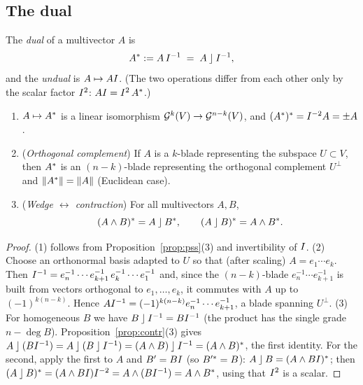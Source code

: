 \subsection{The dual}

\begin{definition}\label{def:dual}
The \emph{dual} of a multivector $A$ is
\[
 A^{\ast}:=A\,I^{-1}\;=\;A\mathbin{\rfloor}I^{-1},
\]
and the \emph{undual} is $A\mapsto AI$. (The two operations differ from each other only by the scalar factor $I^{2}$: $AI=I^2\,A^{\ast}$.)
\end{definition}

\begin{theorem}\label{thm:dual}
\begin{enumerate}
  \item $A\mapsto A^{\ast}$ is a linear isomorphism $\mathcal{G}^k(V)\to\mathcal{G}^{n-k}(V)$, and $(A^{\ast})^{\ast}=I^{-2}A=\pm A$.
  \item (\emph{Orthogonal complement}) If $A$ is a $k$-blade representing the subspace $U\subset V$, then $A^{\ast}$ is an $(n-k)$-blade representing the orthogonal complement $U^\perp$ and $\left\lVert A^{\ast}\right\rVert=\left\lVert A\right\rVert$ (Euclidean case).
  \item (\emph{Wedge $\leftrightarrow$ contraction}) For all multivectors $A,B$,
  \begin{equation}\label{eq:dualduality}
   \dual{(A\wedge B)}=A\lc\dual B,\qquad \dual{(A\lc B)}=A\wedge\dual B .
  \end{equation}
\end{enumerate}
\end{theorem}
\begin{proof}
(1) follows from Proposition~\ref{prop:pss}(3) and invertibility of $I$.
(2) Choose an orthonormal basis adapted to $U$ so that (after scaling) $A=e_1\cdots e_k$. Then $I^{-1}=e_n^{-1}\cdots e_{k+1}^{-1}\,e_k^{-1}\cdots e_1^{-1}$ and, since the $(n-k)$-blade $e_n^{-1}\cdots e_{k+1}^{-1}$ is built from vectors orthogonal to $e_1,\dots,e_k$, it commutes with $A$ up to $(-1)^{k(n-k)}$. Hence $AI^{-1}=(-1)^{k(n-k)}e_n^{-1}\cdots e_{k+1}^{-1}$, a blade spanning $U^\perp$.
(3) For homogeneous $B$ we have $B\mathbin{\rfloor}I^{-1}=BI^{-1}$ (the product has the single grade $n-\deg B$). Proposition~\ref{prop:contr}(3) gives
$A\mathbin{\rfloor}(BI^{-1})=A\mathbin{\rfloor}(B\mathbin{\rfloor}I^{-1})=(A\wedge B)\mathbin{\rfloor}I^{-1}=(A\wedge B)^{\ast}$, the first identity. For the second, apply the first to $A$ and $B'=BI$ (so $B'^{\ast}=B$): $A\mathbin{\rfloor} B=(A\wedge BI)^{\ast}$; then $(A\mathbin{\rfloor} B)^{\ast}=(A\wedge BI)I^{-2}=A\wedge(BI^{-1})=A\wedge B^{\ast}$, using that $I^{2}$ is a scalar.
\end{proof}

